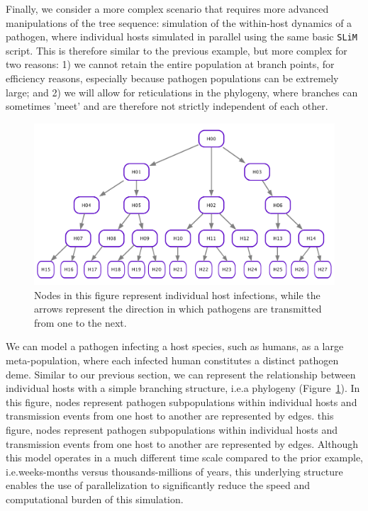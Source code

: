 \documentclass[12pt]{article}
\newcommand{\slim}[0]{\texttt{SLiM}\xspace}
\newcommand*{\ie}{i.e.\xcomma}
\begin{document}
Finally, we consider a more complex scenario that requires more advanced manipulations of the tree sequence:
simulation of the within-host dynamics of a pathogen,
where individual hosts simulated in parallel using the same basic \slim script.
This is therefore similar to the previous example, but more complex for two reasons:
1) we cannot retain the entire population at branch points, for efficiency reasons, especially because pathogen populations can be extremely large; and
2) we will allow for reticulations in the phylogeny, where branches can sometimes 'meet' and are therefore not strictly independent of each other.


\begin{figure}[h!]
    \centering
     \includegraphics[width=\textwidth]{figures/DAG_no_reticulation.pdf}
     \caption{
        Nodes in this figure represent individual host infections, while the arrows represent the direction in which pathogens are transmitted from one to the next. 
     \label{fig:DAG_no_reticulation}
     }
    \end{figure}

We can model a pathogen infecting a host species, such as humans, as a large meta-population, where each infected human constitutes a distinct pathogen deme.
Similar to our previous section, we can represent the relationship between individual hosts with a simple branching structure, \ie a phylogeny (Figure~\ref{fig:DAG_no_reticulation}).
In this figure, nodes represent pathogen subpopulations within individual hosts and transmission events from one host to another are represented by edges.
this figure, nodes represent pathogen subpopulations within individual hosts and transmission events from one host to another are represented by edges.
Although this model operates in a much different time scale compared to the prior example,
\ie weeks-months versus thousands-millions of years, this underlying structure enables the use of parallelization
to significantly reduce the speed and computational burden of this simulation.
\end{document}
